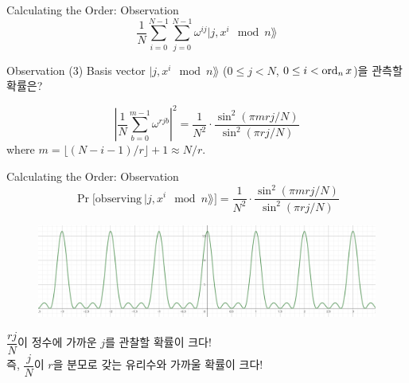 \documentclass[../240513_msquare_shor.tex]{subfiles}
\begin{document}
\begin{frame}{Calculating the Order: Observation}
    \[
        \frac{1}{N}\sum_{i=0}^{N-1}\sum_{j=0}^{N-1} \omega^{ij} | j, x^i \mod n \rang
    \]
    \begin{exampleblock}{Observation (3)}
        Basis vector \(| j, x^i \mod n \rang\) (\(0 \le j < N\), \(0 \le i < \operatorname{ord}_n x\))을 관측할 확률은?
        \pause
        \begin{center}
        \end{center}
        \pause
        \[
            \left| \frac{1}{N} \sum_{b=0}^{m-1} \omega^{rjb} \right|^2
            = \frac{1}{N^2} \cdot \frac{\sin^2(\pi m rj / N)}{\sin^2(\pi rj / N)}
        \]
        where \(m = \lfloor (N - i - 1) / r \rfloor + 1 \approx N / r\).
    \end{exampleblock}
\end{frame}

\begin{frame}{Calculating the Order: Observation}
    \[
        \Pr\big[\text{observing}~ | j, x^i \mod n \rang\big]
        = \frac{1}{N^2} \cdot \frac{\sin^2(\pi m rj / N)}{\sin^2(\pi rj / N)}
    \]
    \begin{figure}
        \centering
        \includegraphics[width=\textwidth]{images/probability.png}
    \end{figure}
    \begin{center}
        \pause
        \(\dfrac{rj}{N}\)이 정수에 가까운 \(j\)를 관찰할 확률이 크다! \\
        \pause
        즉, \(\dfrac{j}{N}\)이 \(r\)을 분모로 갖는 유리수와 가까울 확률이 크다!
    \end{center}
\end{frame}
\end{document}

